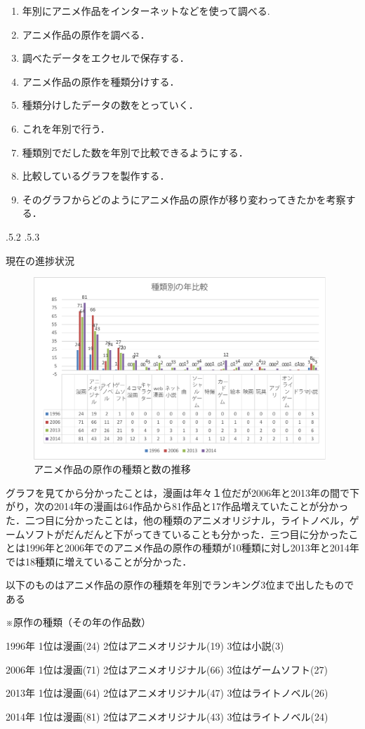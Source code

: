 \documentclass[uplatex]{jsarticle}
\makeatletter
\renewcommand{\section}{%
    \if@slide\clearpage\fi
    \@startsection{section}{1}{\z@}%
    {\Cvs \@plus.5\Cdp \@minus.2\Cdp}%
    {.5\Cvs \@plus.3\Cdp}%
    {\normalfont\raggedright}}
\makeatother
\begin{document}
\begin{enumerate}
\item 年別にアニメ作品をインターネットなどを使って調べる\cite{self01}\cite{self02}\cite{self03}.
\item アニメ作品の原作を調べる\cite{self04}．
\item 調べたデータをエクセルで保存する．
\item アニメ作品の原作を種類分けする．
\item 種類分けしたデータの数をとっていく．
\item これを年別で行う．
\item 種類別でだした数を年別で比較できるようにする．
\item 比較しているグラフを製作する．
\item そのグラフからどのようにアニメ作品の原作が移り変わってきたかを考察する．
\end{enumerate}
\section{現在の進捗状況}
　\begin{figure}
\vspace*{-\intextsep}
\includegraphics[width=11cm,clip]{01.pdf}
\caption{アニメ作品の原作の種類と数の推移}\label{図1}
\end{figure}
グラフを見てから分かったことは，漫画は年々１位だが2006年と2013年の間で下がり，次の2014年の漫画は64作品から81作品と17作品増えていたことが分かった．二つ目に分かったことは，他の種類のアニメオリジナル，ライトノベル，ゲームソフトがだんだんと下がってきていることも分かった．三つ目に分かったことは1996年と2006年でのアニメ作品の原作の種類が10種類に対し2013年と2014年では18種類に増えていることが分かった．\par 
\par 
以下のものはアニメ作品の原作の種類を年別でランキング3位まで出したものである\par
 ※原作の種類（その年の作品数）\par 
1996年  1位は漫画(24)   2位はアニメオリジナル(19)  3位は小説(3)\par 
2006年  1位は漫画(71)   2位はアニメオリジナル(66)  3位はゲームソフト(27)\par 
2013年  1位は漫画(64)   2位はアニメオリジナル(47)  3位はライトノベル(26)\par
2014年  1位は漫画(81)   2位はアニメオリジナル(43)  3位はライトノベル(24)\par
\end{document}
